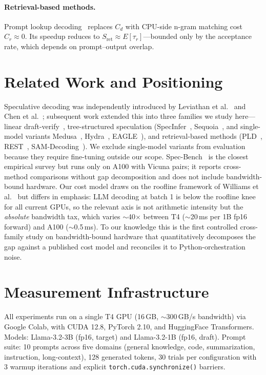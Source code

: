\documentclass[letterpaper,twocolumn,10pt]{article}
\begin{document}
\paragraph{Retrieval-based methods.}
Prompt lookup decoding~\cite{saxena2023pld} replaces $C_d$ with CPU-side n-gram matching cost $C_r \approx 0$.
Its speedup reduces to $S_{\text{ret}} \approx E[\tau_r]$---bounded only by the acceptance rate, which depends on prompt--output overlap.


\section{Related Work and Positioning}
\label{sec:related}

Speculative decoding was independently introduced by Leviathan et al.~\cite{leviathan2023speculative} and Chen et al.~\cite{chen2023accelerating}; subsequent work extended this into three families we study here---linear draft-verify~\cite{leviathan2023speculative,chen2023accelerating,hf_assisted}, tree-structured speculation (SpecInfer~\cite{miao2024specinfer}, Sequoia~\cite{chen2024sequoia}, and single-model variants Medusa~\cite{cai2024medusa}, Hydra~\cite{ankner2024hydra}, EAGLE~\cite{li2024eagle}), and retrieval-based methods (PLD~\cite{saxena2023pld}, REST~\cite{he2024rest}, SAM-Decoding~\cite{hu2024samdecoding}).
We exclude single-model variants from evaluation because they require fine-tuning outside our scope.
Spec-Bench~\cite{xia2024specbench} is the closest empirical survey but runs only on A100 with Vicuna pairs; it reports cross-method comparisons without gap decomposition and does not include bandwidth-bound hardware.
Our cost model draws on the roofline framework of Williams et al.~\cite{williams2009roofline} but differs in emphasis: LLM decoding at batch 1 is below the roofline knee for all current GPUs, so the relevant axis is not arithmetic intensity but the \emph{absolute} bandwidth tax, which varies $\sim$40$\times$ between T4 ($\sim$20\,ms per 1B fp16 forward) and A100 ($\sim$0.5\,ms).
To our knowledge this is the first controlled cross-family study on bandwidth-bound hardware that quantitatively decomposes the gap against a published cost model and reconciles it to Python-orchestration noise.


\section{Measurement Infrastructure}
\label{sec:infra}

All experiments run on a single T4 GPU (16\,GB, $\sim$300\,GB/s bandwidth) via Google Colab, with CUDA 12.8, PyTorch 2.10, and HuggingFace Transformers.
Models: Llama-3.2-3B (fp16, target) and Llama-3.2-1B (fp16, draft).
Prompt suite: 10 prompts across five domains (general knowledge, code, summarization, instruction, long-context), 128 generated tokens, 30 trials per configuration with 3 warmup iterations and explicit \texttt{torch.cuda.synchronize()} barriers.
\end{document}
